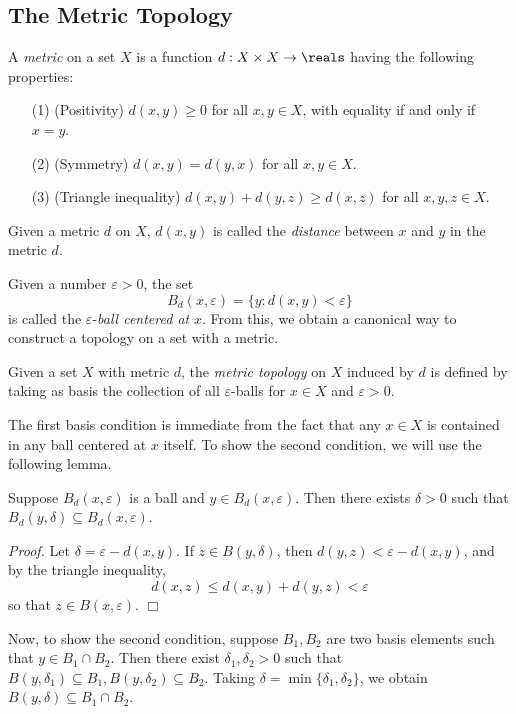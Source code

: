 \subsection{The Metric Topology}
\begin{definition}\label{2.52}
    A {\it metric} on a set $X$ is a function $d: X \times X \rightarrow \reals$ having the following properties:
    \begin{enumerate}
        \item[(1)] (Positivity) $d(x, y) \geq 0$ for all $x, y \in X$, with equality if and only if $x = y$.
        \item[(2)] (Symmetry) $d(x, y) = d(y, x)$ for all $x, y \in X$.
        \item[(3)] (Triangle inequality) $d(x, y) + d(y, z) \geq d(x, z)$ for all $x, y, z \in X.$
    \end{enumerate}
    Given a metric $d$ on $X$, $d(x, y)$ is called the {\it distance} between $x$ and $y$ in the metric $d$.
\end{definition}
Given a number $\varepsilon > 0$, the set
$$B_d(x, \varepsilon) = \{y: d(x, y) < \varepsilon\}$$
is called the $\varepsilon$-{\it ball centered at } $x$. From this, we obtain a canonical way to construct a topology on a set with a metric.
\begin{definition}\label{2.53}
    Given a set $X$ with metric $d$, the {\it metric topology} on $X$ induced by $d$ is defined by taking as basis the collection of all $\varepsilon$-balls for $x \in X$ and $\varepsilon > 0$.
\end{definition}
The first basis condition is immediate from the fact that any $x \in X$ is contained in any ball centered at $x$ itself. To show the second condition, we will use the following lemma.
\begin{lemma}\label{2.54}
    Suppose $B_d(x, \varepsilon)$ is a ball and $y \in B_d(x, \varepsilon)$. Then there exists $\delta > 0$ such that $B_d(y, \delta) \subseteq B_d(x, \varepsilon)$.
\end{lemma}
{\it Proof.} Let $\delta = \varepsilon - d(x, y)$. If $z \in B(y, \delta)$, then $d(y, z) < \varepsilon - d(x, y)$, and by the triangle inequality,
$$d(x, z) \leq d(x, y) + d(y, z) < \varepsilon$$
so that $z \in B(x, \varepsilon)$. $\Box$

Now, to show the second condition, suppose $B_1, B_2$ are two basis elements such that $y \in B_1 \cap B_2$. Then there exist $\delta_1, \delta_2 > 0$ such that $B(y, \delta_1) \subseteq B_1, B(y, \delta_2) \subseteq B_2$. Taking $\delta = \min\{\delta_1, \delta_2\}$, we obtain $B(y, \delta) \subseteq B_1 \cap B_2$.

